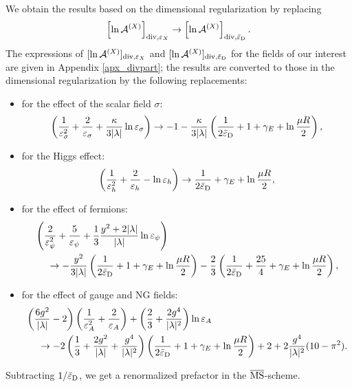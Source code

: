 \documentclass[12pt]{article}
\begin{document}
We obtain the results based on the dimensional regularization by
replacing
\begin{align}
  \left[
    \ln\mathcal A^{(X)}
  \right]_{{\rm div}, \varepsilon_{X}}
  \rightarrow
  \left[
    \ln\mathcal A^{(X)}
  \right]_{{\rm div}, \bar{\varepsilon}_{\rm D}}.
\end{align}
The expressions of $[\ln\mathcal A^{(X)}]_{{\rm div}, \varepsilon_{X}}$ and
$[\ln\mathcal A^{(X)}]_{{\rm div}, \bar{\varepsilon}_{\rm D}}$ for the fields of our
interest are given in Appendix \ref{apx_divpart}; the results are
converted to those in the dimensional regularization by the following
replacements:
\begin{itemize}
\item for the effect of the scalar field $\sigma$:
  \begin{align}
    \left(
      \frac{1}{\varepsilon_{\sigma}^2}+\frac{2}{\varepsilon_{\sigma}}
      +\frac{\kappa}{3|\lambda|}\ln\varepsilon_{\sigma}
    \right)
    \rightarrow
    -1-\frac{\kappa}{3|\lambda|}
    \left(
      \frac{1}{2\bar{\varepsilon}_{\rm D}}+1+\gamma_E+\ln\frac{\mu R}{2}
    \right),
    \label{eq_ScalarRegulatorRel} 
  \end{align}
\item for the Higgs effect:
  \begin{align}
    \left(
      \frac{1}{\varepsilon_{h}^2}+\frac{2}{\varepsilon_{h}}-\ln\varepsilon_{h}
    \right)
    \rightarrow
    \frac{1}{2\bar{\varepsilon}_{\rm D}}+\gamma_E+\ln\frac{\mu R}{2}, \\
  \end{align}
\item for the effect of fermions:
  \begin{align}
    & \left(
      \frac{2}{\varepsilon_{\psi}^2}+\frac{5}{\varepsilon_{\psi}}
      +\frac{1}{3}\frac{y^2+2|\lambda|}{|\lambda|}\ln\varepsilon_{\psi}
    \right)\nonumber                                                 \\
    & \hspace{3ex}\to -\frac{y^2}{3|\lambda|}
    \left(
      \frac{1}{2\bar{\varepsilon}_{\rm D}}+1+\gamma_E+\ln\frac{\mu R}{2}
    \right)-\frac{2}{3}
    \left(
      \frac{1}{2\bar{\varepsilon}_{\rm D}}+\frac{25}{4}+\gamma_E+\ln\frac{\mu R}{2}
    \right),  
  \end{align}
\item for the effect of gauge and NG fields:
  \begin{align}
    & \left(
      \frac{6g^2}{|\lambda|}-2
    \right)
    \left(
      \frac{1}{\varepsilon_{A}^2}+\frac{2}{\varepsilon_{A}}
    \right)+
    \left(
      \frac{2}{3}+\frac{2g^4}{|\lambda|^2}
    \right)\ln\varepsilon_{A}\nonumber                                       \\
    & \hspace{3ex}\to-2
    \left(
      \frac{1}{3}+\frac{2g^2}{|\lambda|}+\frac{g^4}{|\lambda|^2}
    \right)
    \left(
      \frac{1}{2\bar{\varepsilon}_{\rm D}}+1+\gamma_E+\ln\frac{\mu R}{2}
    \right)+2+2\frac{g^4}{|\lambda|^2}(10-\pi^2).
  \end{align}
\end{itemize}
Subtracting $1/\bar{\varepsilon}_{\rm D}$, we get a renormalized prefactor in the
$\overline{\rm MS}$-scheme.
\end{document}
